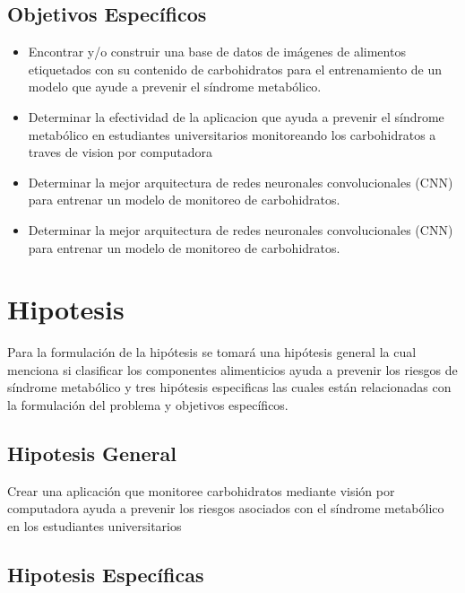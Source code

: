 \subsection{Objetivos Espec\'{i}ficos}
\newcommand{\Objone}{
Encontrar y/o construir una base de datos de imágenes de alimentos etiquetados con su contenido de carbohidratos para el entrenamiento de un modelo que ayude a prevenir el síndrome metabólico.

}
\newcommand{\Objtwo}{
Determinar la efectividad de la aplicacion que ayuda a prevenir el síndrome metabólico en estudiantes universitarios monitoreando los carbohidratos a traves de vision por computadora 
}
\newcommand{\Objthree}{
Determinar la mejor arquitectura de redes neuronales convolucionales (CNN) para entrenar un modelo de monitoreo de carbohidratos.
}
\newcommand{\Objfour}{
Determinar la mejor arquitectura de redes neuronales convolucionales (CNN) para entrenar un modelo de monitoreo de carbohidratos.
}

\begin{itemize}
	\item {\Objone}
	\item {\Objtwo}
	\item {\Objthree}
	\item {\Objfour} 
\end{itemize}

\section{Hipotesis}

Para la formulación de la hipótesis se tomará una hipótesis general la cual menciona si clasificar los componentes alimenticios ayuda a prevenir los riesgos de síndrome metabólico y tres hipótesis especificas las cuales están relacionadas con la formulación del problema y objetivos específicos.

\subsection{Hipotesis General}
\newcommand{\HipotesisGeneral}{
Crear una aplicación que monitoree carbohidratos mediante visión por computadora ayuda a prevenir los riesgos asociados con el síndrome metabólico en los estudiantes universitarios}
\HipotesisGeneral
\subsection{Hipotesis Específicas}
\newcommand{\Hone}{
 Una base de datos de imágenes de alimentos etiquetados con su contenido de carbohidratos permite entrenar un modelo que ayude a prevenir el síndrome metabólico.
}
\newcommand{\Htwo}{
La efectividad de la aplicacion de visión por computadora que monitorea los carbohidratos ayuda a prevenir el síndrome metabólico en estudiantes universitarios
}
\newcommand{\Hthree}{
La mejor arquitectura de redes neuronales convolucionales (CNN) permite entrenar un modelo de monitoreo de carbohidratos
}
\newcommand{\Hfour}{
 Mediante la aplicación de técnicas de preprocesamiento de imágenes, se logra mejorar la precisión del modelo de monitoreo de carbohidratos al reducir la interferencia del ruido en las imágenes de alimentos.
}


